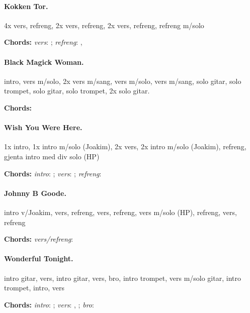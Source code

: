 \documentclass[%
twoside,                 %
draft,                   %
final,                   %
10pt]{article}
\begin{document}
\paragraph{Kokken Tor.}
4x vers, refreng, 2x vers, refreng, 2x vers, refreng, refreng m/solo

\textbf{Chords:} \emph{vers}: ;
\emph{refreng}: , 





\paragraph{Black Magick Woman.}
intro, vers m/solo, 2x vers m/sang, vers m/solo, vers m/sang, solo gitar, solo trompet, solo gitar, solo trompet, 2x solo gitar.

\textbf{Chords:} 






\paragraph{Wish You Were Here.}
1x intro, 1x intro m/solo (Joakim), 2x vers, 2x intro m/solo (Joakim), refreng,
gjenta intro med div solo (HP)


\textbf{Chords:} \emph{intro}: ;
\emph{vers}: ; \emph{refreng}: 





\paragraph{Johnny B Goode.}
intro v/Joakim, vers, refreng, vers, refreng, vers m/solo (HP), refreng,
vers, refreng

\textbf{Chords:} \emph{vers/refreng}: 


\paragraph{Wonderful Tonight.}
intro gitar, vers, intro gitar, vers, bro, intro trompet, vers m/solo gitar, intro trompet, intro, vers

\textbf{Chords:} \emph{intro}: ;
\emph{vers}:
, ;
\emph{bro}: 
\end{document}
